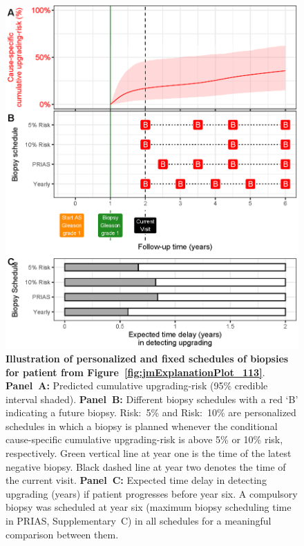 \begin{figure}
\centerline{\includegraphics[width=\columnwidth]{images/demo_pat1.eps}}
\caption{\textbf{Illustration of personalized and fixed schedules of biopsies for patient from Figure~\ref{fig:jmExplanationPlot_113}}. \textbf{Panel~A:} Predicted cumulative upgrading-risk (95\% credible interval shaded). \textbf{Panel~B:} Different biopsy schedules with a red `B' indicating a future biopsy. Risk:~5\% and Risk:~10\% are personalized schedules in which a biopsy is planned whenever the conditional cause-specific cumulative upgrading-risk is above 5\% or 10\% risk, respectively. Green vertical line at year one is the time of the latest negative biopsy. Black dashed line at year two denotes the time of the current visit. \textbf{Panel~C:} Expected time delay in detecting upgrading (years) if patient progresses before year six. A compulsory biopsy was scheduled at year six (maximum biopsy scheduling time in PRIAS, Supplementary~C) in all schedules for a meaningful comparison between them.}
\label{fig:demo_pat1}
\end{figure}

